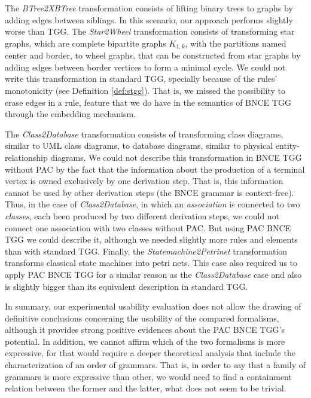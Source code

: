 The \emph{BTree2XBTree} transformation consists of lifting binary trees to graphs by adding edges between siblings. In this scenario, our approach performs slightly worse than TGG. The \emph{Star2Wheel} transformation consists of transforming star graphs, which are complete bipartite graphs $K_{1,k}$, with the partitions named center and border, to wheel graphs, that can be constructed from star graphs by adding edges between border vertices to form a minimal cycle. We could not write this transformation in standard TGG, specially because of the rules' monotonicity (see Definition \ref{def:stgg}). That is, we missed the possibility to erase edges in a rule, feature that we do have in the semantics of BNCE TGG through the embedding mechanism.

The \emph{Class2Database} transformation consists of transforming class diagrams, similar to UML class diagrams, to database diagrams, similar to physical entity-relationship diagrams. We could not describe this transformation in BNCE TGG without PAC by the fact that the information about the production of a terminal vertex is owned exclusively by one derivation step. That is, this information cannot be used by other derivation steps (the BNCE grammar is context-free). Thus, in the case of \emph{Class2Database}, in which an \textit{association} is connected to two \textit{classes}, each been produced by two different derivation steps, we could not connect one association with two classes without PAC. But using PAC BNCE TGG we could describe it, although we needed slightly more rules and elements than with standard TGG. Finally, the \emph{Statemachine2Petrinet} transformation transforms classical state machines into petri nets. This case also required us to apply PAC BNCE TGG for a similar reason as the \emph{Class2Database} case and also is slightly bigger than its equivalent description in standard TGG.

In summary, our experimental usability evaluation does not allow the drawing of definitive conclusions concerning the usability of the compared formalisms, although it provides strong positive evidences about the PAC BNCE TGG's potential. In addition, we cannot affirm which of the two formalisms is more expressive, for that would require a deeper theoretical analysis that include the characterization of an order of grammars. That is, in order to say that a family of grammars is more expressive than other, we would need to find a containment relation between the former and the latter, what does not seem to be trivial.

